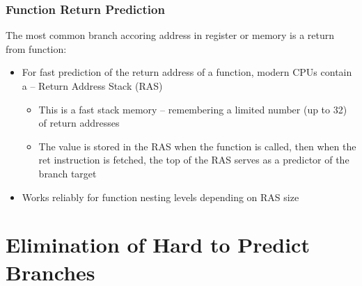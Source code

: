 \documentclass{beamer}
\begin{document}
\begin{frame}
\frametitle{Function Return Prediction}

The most common branch accoring address in register or memory is a return from function:
\begin{itemize}
\item For fast prediction of the return address of a function, modern CPUs contain a -- Return Address Stack (RAS)
\begin{itemize}
\item This is a fast stack memory -- remembering a limited number (up to 32) of return addresses
\item The value is stored in the RAS when the function is called, then when the ret instruction is fetched, the top of the RAS serves as a predictor of the branch target
\end{itemize}
\item Works reliably for function nesting levels depending on RAS size
\end{itemize}
\end{frame}

\section{Elimination of Hard to Predict Branches}
\end{document}

